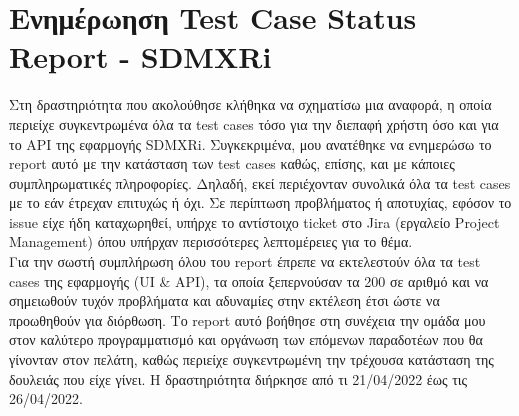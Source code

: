 \section*{Ενημέρωηση Test Case Status Report - SDMXRi}
Στη δραστηριότητα που ακολούθησε κλήθηκα να σχηματίσω μια αναφορά, η οποία περιείχε συγκεντρωμένα όλα τα test cases τόσο για την διεπαφή χρήστη 
όσο και για το ΑΡΙ της εφαρμογής SDMXRi. Συγκεκριμένα, μου ανατέθηκε να ενημερώσω το report αυτό με την κατάσταση των test cases καθώς, επίσης, και 
με κάποιες συμπληρωματικές πληροφορίες. Δηλαδή, εκεί περιέχονταν συνολικά όλα τα test cases με το εάν έτρεχαν επιτυχώς ή όχι. Σε περίπτωση 
προβλήματος ή αποτυχίας, εφόσον το issue είχε ήδη καταχωρηθεί, υπήρχε το αντίστοιχο ticket στο Jira (εργαλείο Project Management) όπου υπήρχαν περισσότερες λεπτομέρειες για το θέμα. \\

Για την σωστή συμπλήρωση όλου του report έπρεπε να εκτελεστούν όλα τα test cases της εφαρμογής (UI \& API), τα οποία ξεπερνούσαν τα 200 σε αριθμό και να σημειωθούν τυχόν 
προβλήματα και αδυναμίες στην εκτέλεση έτσι ώστε να προωθηθούν για διόρθωση. Το report αυτό βοήθησε στη συνέχεια την ομάδα μου στον καλύτερο προγραμματισμό και οργάνωση 
των επόμενων παραδοτέων που θα γίνονταν στον πελάτη, καθώς περιείχε συγκεντρωμένη την τρέχουσα κατάσταση της δουλειάς που είχε γίνει. Η δραστηριότητα διήρκησε από τι 21/04/2022 έως τις 26/04/2022.

